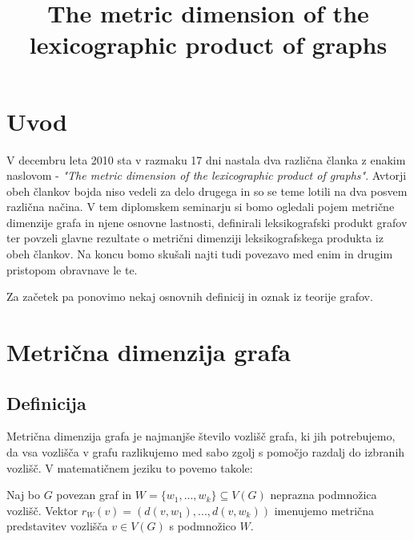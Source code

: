 \documentclass[mat1, tisk]{fmfdelo}
\title{The metric dimension of the lexicographic product of graphs}
\begin{document}
\section{Uvod}
V decembru leta 2010 sta v razmaku 17 dni nastala dva različna članka z enakim naslovom - 
\textit{"The metric dimension of the lexicographic product of graphs"}. Avtorji obeh člankov bojda niso vedeli za delo drugega 
in so se teme lotili na dva posvem različna načina. V tem diplomskem seminarju si bomo ogledali pojem metrične dimenzije grafa in 
njene osnovne lastnosti, definirali leksikografski produkt grafov ter povzeli glavne rezultate o metrični dimenziji leksikografskega 
produkta iz obeh člankov. Na koncu bomo skušali najti tudi povezavo med enim in drugim pristopom obravnave le te. 

Za začetek pa ponovimo nekaj osnovnih definicij in oznak iz teorije grafov. 







\section{Metrična dimenzija grafa}


\subsection{Definicija}

Metrična dimenzija grafa je najmanjše število vozlišč grafa, ki jih potrebujemo, da
vsa vozlišča v grafu razlikujemo med sabo zgolj s pomočjo razdalj do izbranih vozlišč.
V matematičnem jeziku to povemo takole:

\begin{definicija}
    Naj bo $G$ povezan graf in $W = \{ w_1, ... , w_k  \} \subseteq V(G)$ neprazna podmnožica vozlišč. 
    Vektor $r_W(v) = (d(v, w_1), ..., d(v, w_k))$ imenujemo metrična predstavitev vozlišča $v \in V(G)$ s podmnožico $W$.
\end{definicija}
\end{document}
